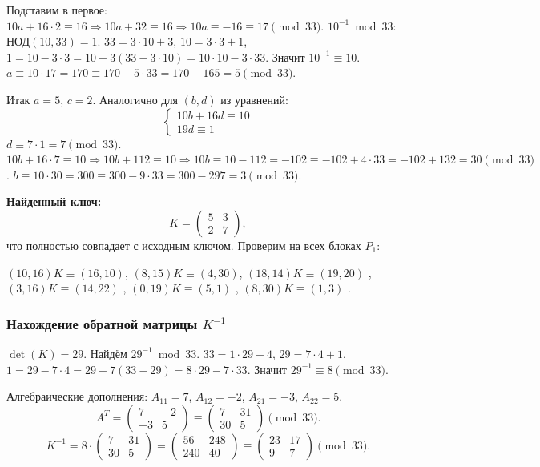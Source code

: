 Подставим в первое: $10 a + 16\cdot 2 \equiv 16 \Rightarrow 10 a + 32 \equiv 16 \Rightarrow 10 a \equiv -16 \equiv 17 \pmod{33}$.
$10^{-1} \bmod 33$: $\text{НОД}(10,33)=1$. $33 = 3\cdot 10 + 3$, $10 = 3\cdot 3 + 1$, $1 = 10 - 3\cdot 3 = 10 - 3(33 - 3\cdot 10) = 10\cdot 10 - 3\cdot 33$. Значит $10^{-1} \equiv 10$.
$a \equiv 10\cdot 17 = 170 \equiv 170 - 5\cdot 33 = 170 - 165 = 5 \pmod{33}$.

Итак $a = 5$, $c = 2$. Аналогично для $(b,d)$ из уравнений:
\[
\begin{cases}
10 b + 16 d \equiv 10 \\
19 d \equiv 1
\end{cases}
\]
$d \equiv 7\cdot 1 = 7 \pmod{33}$.
$10 b + 16\cdot 7 \equiv 10 \Rightarrow 10 b + 112 \equiv 10 \Rightarrow 10 b \equiv 10 - 112 = -102 \equiv -102 + 4\cdot 33 = -102 + 132 = 30 \pmod{33}$.
$b \equiv 10\cdot 30 = 300 \equiv 300 - 9\cdot 33 = 300 - 297 = 3 \pmod{33}$.

\textbf{Найденный ключ:}
\[
K = \begin{pmatrix} 5 & 3 \\ 2 & 7 \end{pmatrix},
\]
что полностью совпадает с исходным ключом. Проверим на всех блоках $P_1$:

$(10,16)K \equiv (16,10)$, $(8,15)K \equiv (4,30)$, $(18,14)K \equiv (19,20)$ , $(3,16)K \equiv (14,22)$ , $(0,19)K \equiv (5,1)$ , $(8,30)K \equiv (1,3)$ .

\subsubsection{Нахождение обратной матрицы $K^{-1}$}

$\det(K) = 29$. Найдём $29^{-1} \bmod 33$.
$33 = 1\cdot 29 + 4$, $29 = 7\cdot 4 + 1$, $1 = 29 - 7\cdot 4 = 29 - 7(33 - 29) = 8\cdot 29 - 7\cdot 33$. Значит $29^{-1} \equiv 8 \pmod{33}$.

Алгебраические дополнения: $A_{11} = 7$, $A_{12} = -2$, $A_{21} = -3$, $A_{22} = 5$.
\[
A^T = \begin{pmatrix} 7 & -2 \\ -3 & 5 \end{pmatrix} \equiv \begin{pmatrix} 7 & 31 \\ 30 & 5 \end{pmatrix} \pmod{33}.
\]
\[
K^{-1} = 8 \cdot \begin{pmatrix} 7 & 31 \\ 30 & 5 \end{pmatrix} = \begin{pmatrix} 56 & 248 \\ 240 & 40 \end{pmatrix} \equiv \begin{pmatrix} 23 & 17 \\ 9 & 7 \end{pmatrix} \pmod{33}.
\]

